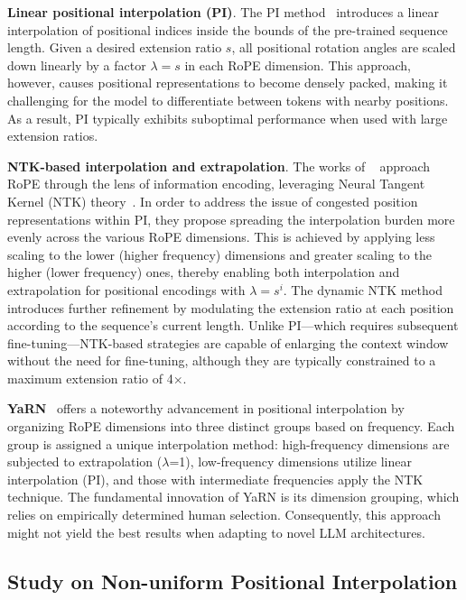 \textbf{Linear positional interpolation (PI)}. The PI method~\cite{pi} introduces a linear interpolation of positional indices inside the bounds of the pre-trained sequence length. Given a desired extension ratio $s$, all positional rotation angles are scaled down linearly by a factor $\lambda=s$ in each RoPE dimension. This approach, however, causes positional representations to become densely packed, making it challenging for the model to differentiate between tokens with nearby positions. As a result, PI typically exhibits suboptimal performance when used with large extension ratios.

\textbf{NTK-based interpolation and extrapolation}. The works of ~\cite{ntk,dynamicntk} approach RoPE through the lens of information encoding, leveraging Neural Tangent Kernel (NTK) theory~\cite{jacot2018neural,tancik2020fourier}. In order to address the issue of congested position representations within PI, they propose spreading the interpolation burden more evenly across the various RoPE dimensions. This is achieved by applying less scaling to the lower (higher frequency) dimensions and greater scaling to the higher (lower frequency) ones, thereby enabling both interpolation and extrapolation for positional encodings with $\lambda=s^{i}$. The dynamic NTK method~\cite{dynamicntk} introduces further refinement by modulating the extension ratio at each position according to the sequence’s current length. Unlike PI—which requires subsequent fine-tuning—NTK-based strategies are capable of enlarging the context window without the need for fine-tuning, although they are typically constrained to a maximum extension ratio of 4$\times$.

\textbf{YaRN}~\cite{yarn} offers a noteworthy advancement in positional interpolation by organizing RoPE dimensions into three distinct groups based on frequency. Each group is assigned a unique interpolation method: high-frequency dimensions are subjected to extrapolation ($\lambda$=1), low-frequency dimensions utilize linear interpolation (PI), and those with intermediate frequencies apply the NTK technique. The fundamental innovation of YaRN is its dimension grouping, which relies on empirically determined human selection. Consequently, this approach might not yield the best results when adapting to novel LLM architectures.

\subsection{Study on Non-uniform Positional Interpolation}

